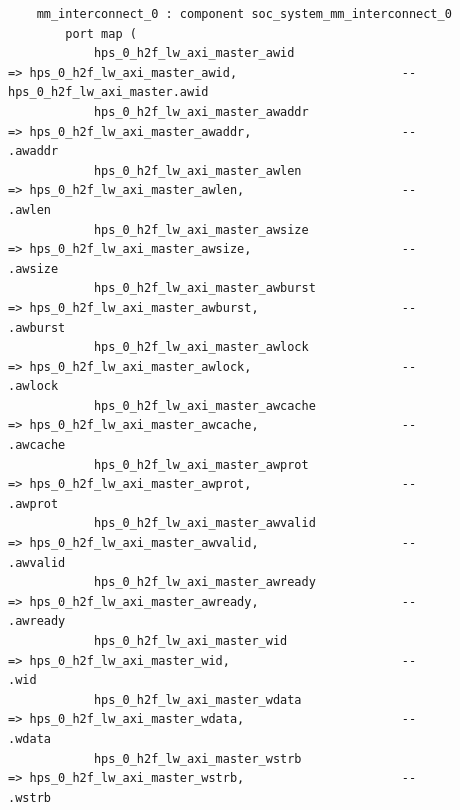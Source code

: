 \documentclass[conference]{IEEEtran}
\begin{document}
\begin{lstlisting}
	mm_interconnect_0 : component soc_system_mm_interconnect_0
		port map (
			hps_0_h2f_lw_axi_master_awid                                        => hps_0_h2f_lw_axi_master_awid,                       --                                       hps_0_h2f_lw_axi_master.awid
			hps_0_h2f_lw_axi_master_awaddr                                      => hps_0_h2f_lw_axi_master_awaddr,                     --                                                              .awaddr
			hps_0_h2f_lw_axi_master_awlen                                       => hps_0_h2f_lw_axi_master_awlen,                      --                                                              .awlen
			hps_0_h2f_lw_axi_master_awsize                                      => hps_0_h2f_lw_axi_master_awsize,                     --                                                              .awsize
			hps_0_h2f_lw_axi_master_awburst                                     => hps_0_h2f_lw_axi_master_awburst,                    --                                                              .awburst
			hps_0_h2f_lw_axi_master_awlock                                      => hps_0_h2f_lw_axi_master_awlock,                     --                                                              .awlock
			hps_0_h2f_lw_axi_master_awcache                                     => hps_0_h2f_lw_axi_master_awcache,                    --                                                              .awcache
			hps_0_h2f_lw_axi_master_awprot                                      => hps_0_h2f_lw_axi_master_awprot,                     --                                                              .awprot
			hps_0_h2f_lw_axi_master_awvalid                                     => hps_0_h2f_lw_axi_master_awvalid,                    --                                                              .awvalid
			hps_0_h2f_lw_axi_master_awready                                     => hps_0_h2f_lw_axi_master_awready,                    --                                                              .awready
			hps_0_h2f_lw_axi_master_wid                                         => hps_0_h2f_lw_axi_master_wid,                        --                                                              .wid
			hps_0_h2f_lw_axi_master_wdata                                       => hps_0_h2f_lw_axi_master_wdata,                      --                                                              .wdata
			hps_0_h2f_lw_axi_master_wstrb                                       => hps_0_h2f_lw_axi_master_wstrb,                      --                                                              .wstrb

\end{lstlisting}
\end{document}
